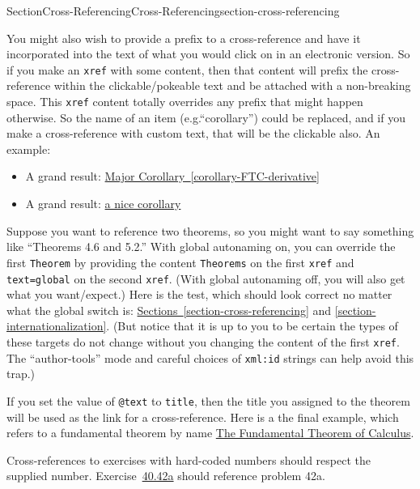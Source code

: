 \documentclass[twoside,10pt,]{article}
\newcommand{\xreffont}{\relax}
\newcommand{\mono}[1]{\texttt{#1}}
\numberwithin{equation}{section}
\begin{document}
\begin{sectionptx}{Section}{Cross-Referencing}{}{Cross-Referencing}{}{}{section-cross-referencing}
\begin{itemize}[label=\textbullet]
\end{itemize}
%
\par
You might also wish to provide a prefix to a cross-reference and have it incorporated into the text of what you would click on in an electronic version.  So if you make an \mono{xref} with some content, then that content will prefix the cross-reference within the clickable\slash{}pokeable text and be attached with a non-breaking space.  This \mono{xref} content totally overrides any prefix that might happen otherwise.  So the name of an item (e.g.\@ ``corollary'') could be replaced, and if you make a cross-reference with custom text, that will be the clickable also.  An example:%
\begin{itemize}[label=\textbullet]
\item{}A grand result: \hyperref[corollary-FTC-derivative]{Major Corollary~{\xreffont\ref{corollary-FTC-derivative}}}%
\item{}A grand result: \hyperref[corollary-FTC-derivative]{a nice corollary}%
\end{itemize}
%
\par
Suppose you want to reference two theorems, so you might want to say something like ``Theorems 4.6 and 5.2.''  With global autonaming on, you can override the first \mono{Theorem} by providing the content \mono{Theorems} on the first \mono{xref} and \mono{text=\textquotedbl{}global\textquotedbl{}} on the second \mono{xref}.  (With global autonaming off, you will also get what you want\slash{}expect.)   Here is the test, which should look correct no matter what the global switch is:  \hyperref[section-cross-referencing]{Sections~{\xreffont\ref{section-cross-referencing}}} and \hyperref[section-internationalization]{{\xreffont\ref{section-internationalization}}}.  (But notice that it is up to you to be certain the types of these targets do not change without you changing the content of the first \mono{xref}.  The ``author-tools'' mode and careful choices of \mono{xml:id} strings can help avoid this trap.)%
\par
If you set the value of \mono{@text} to \mono{title}, then the title you assigned to the theorem will be used as the link for a cross-reference.  Here is a the final example, which refers to a fundamental theorem by name \hyperref[theorem-FTC]{The Fundamental Theorem of Calculus}.%
\par
Cross-references to exercises with hard-coded numbers should respect the supplied number.  Exercise~\hyperlink{exercise-with-hardcoded-number}{{\xreffont 40.42a}} should reference problem 42a.%

\end{sectionptx}
\end{document}
